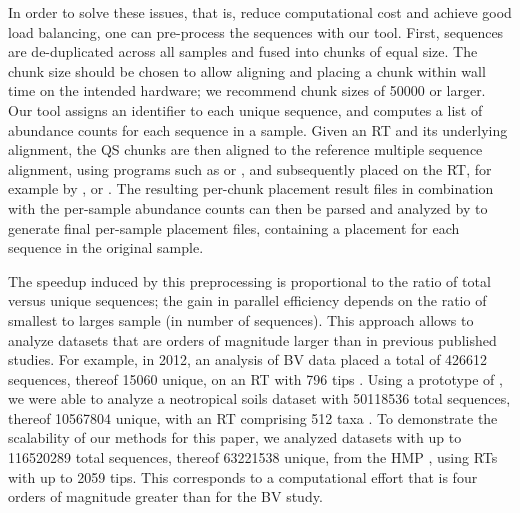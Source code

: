 In order to solve these issues, that is, reduce computational cost and achieve good load balancing,
one can pre-process the sequences with our  tool.
First, sequences are de-duplicated across all samples and fused into chunks of equal size.
The chunk size should be chosen to allow aligning and placing a chunk within wall time on the intended hardware;
we recommend chunk sizes of \num{50 000} or larger.
Our tool assigns an identifier to each unique sequence, and
computes a list of abundance counts for each sequence in a sample.
Given an \ac{RT} and its underlying alignment, the \ac{QS} chunks are then aligned to the reference multiple sequence alignment,
using programs such as   \citep{Berger2012,Berger2011a}
or  \citep{Eddy1998,Eddy2009},
and subsequently placed on the \ac{RT},
for example by ,  or  \citep{Matsen2010,Berger2011,Barbera2018}.
The resulting per-chunk placement result files in combination with the per-sample abundance counts
can then be parsed and analyzed by  to generate final per-sample placement files,
containing a placement for each sequence in the original sample.

The speedup induced by this preprocessing is proportional to the ratio of total versus unique sequences;
the gain in parallel efficiency depends on the ratio of smallest to larges sample (in number of sequences).
This approach allows to analyze datasets that are orders of magnitude larger than in previous published studies.
For example, in 2012, an analysis of \acf{BV} data
placed a total of \num{426 612} sequences, thereof \num{15 060} unique,
on an \ac{RT} with \num{796} tips \citep{Srinivasan2012}.
Using a prototype of ,
we were able to analyze a neotropical soils dataset with \num{50 118 536} total sequences, thereof \num{10 567 804} unique,
with an \ac{RT} comprising \num{512} taxa \citep{Mahe2017}.
To demonstrate the scalability of our methods for this paper,
we analyzed datasets with up to \num{116 520 289} total sequences, thereof \num{63 221 538} unique,
from the \ac{HMP} \citep{Huttenhower2012,Methe2012}, using \acp{RT} with up to \num{2 059} tips.
This corresponds to %
a computational effort that is four orders of magnitude greater than for the \ac{BV} study.

